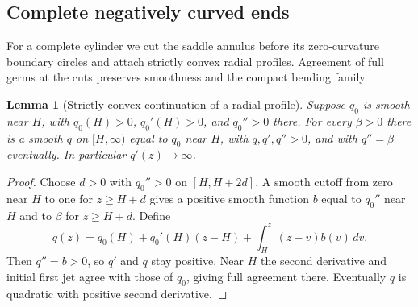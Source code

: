 \documentclass[11pt]{amsart}
\newtheorem{lemma}[theorem]{Lemma}
\theoremstyle{definition}
\theoremstyle{remark}
\numberwithin{equation}{section}
\begin{document}
\subsection{Complete negatively curved ends}\label{sec:complete-cylinder}
For a complete cylinder we cut the saddle annulus before its zero-curvature
boundary circles and attach strictly convex radial profiles. Agreement of
full germs at the cuts preserves smoothness and the compact bending family.

\begin{lemma}[Strictly convex continuation of a radial profile]
\label{lem:complete-profile}
Suppose $q_0$ is smooth near $H$, with $q_0(H)>0$, $q_0'(H)>0$,
and $q_0''>0$ there. For every $\beta>0$ there is a smooth $q$ on
$[H,\infty)$ equal to $q_0$ near $H$, with $q,q',q''>0$, and with
$q''=\beta$ eventually. In particular $q'(z)\to\infty$.
\end{lemma}
\begin{proof}
Choose $d>0$ with $q_0''>0$ on $[H,H+2d]$. A smooth cutoff from zero
near $H$ to one for $z\ge H+d$ gives a positive smooth function $b$
equal to $q_0''$ near $H$ and to $\beta$ for $z\ge H+d$.
Define
\begin{equation}\label{eq:complete-profile}
 q(z)=q_0(H)+q_0'(H)(z-H)+\int_H^z(z-v)b(v)\,dv.
\end{equation}
Then $q''=b>0$, so $q'$ and $q$ stay positive. Near $H$ the second
derivative and initial first jet agree with those of $q_0$, giving full
agreement there. Eventually $q$ is quadratic with positive second derivative.
\end{proof}
\end{document}
